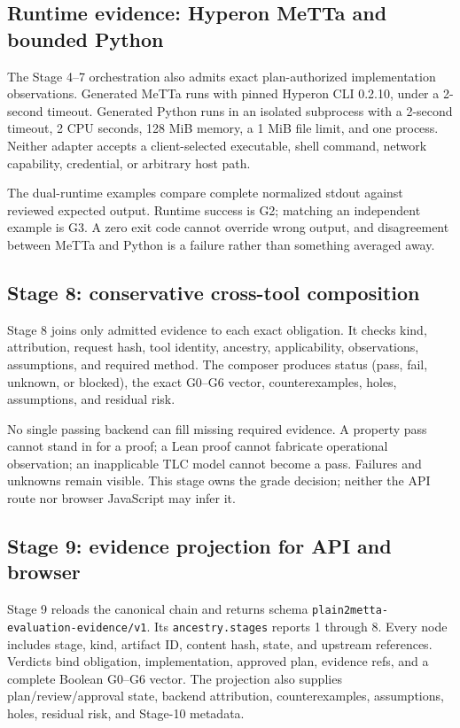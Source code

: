 \documentclass[11pt]{article}
\newcommand{\code}[1]{\texttt{#1}}
\begin{document}
\subsection{Runtime evidence: Hyperon MeTTa and bounded Python}

The Stage 4--7 orchestration also admits exact plan-authorized implementation
observations.  Generated MeTTa runs with pinned Hyperon CLI 0.2.10, under a
2-second timeout.  Generated Python runs in an isolated subprocess with a
2-second timeout, 2 CPU seconds, 128 MiB memory, a 1 MiB file limit, and one
process.  Neither adapter accepts a client-selected executable, shell command,
network capability, credential, or arbitrary host path.

The dual-runtime examples compare complete normalized stdout against reviewed
expected output.  Runtime success is G2; matching an independent example is
G3.  A zero exit code cannot override wrong output, and disagreement between
MeTTa and Python is a failure rather than something averaged away.

\subsection{Stage 8: conservative cross-tool composition}

Stage 8 joins only admitted evidence to each exact obligation.  It checks
kind, attribution, request hash, tool identity, ancestry, applicability,
observations, assumptions, and required method.  The composer produces status
(pass, fail, unknown, or blocked), the exact G0--G6 vector, counterexamples,
holes, assumptions, and residual risk.

No single passing backend can fill missing required evidence.  A property pass
cannot stand in for a proof; a Lean proof cannot fabricate operational
observation; an inapplicable TLC model cannot become a pass.  Failures and
unknowns remain visible.  This stage owns the grade decision; neither the API
route nor browser JavaScript may infer it.

\subsection{Stage 9: evidence projection for API and browser}

Stage 9 reloads the canonical chain and returns schema
\code{plain2metta-evaluation-evidence/v1}.  Its \code{ancestry.stages} reports
1 through 8.  Every node includes stage, kind, artifact ID, content hash,
state, and upstream references.  Verdicts bind obligation, implementation,
approved plan, evidence refs, and a complete Boolean G0--G6 vector.  The
projection also supplies plan/review/approval state, backend attribution,
counterexamples, assumptions, holes, residual risk, and Stage-10 metadata.
\end{document}
